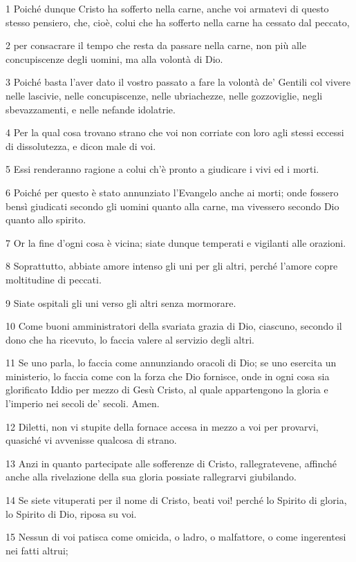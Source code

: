 \par 1 Poiché dunque Cristo ha sofferto nella carne, anche voi armatevi di questo stesso pensiero, che, cioè, colui che ha sofferto nella carne ha cessato dal peccato,
\par 2 per consacrare il tempo che resta da passare nella carne, non più alle concupiscenze degli uomini, ma alla volontà di Dio.
\par 3 Poiché basta l'aver dato il vostro passato a fare la volontà de' Gentili col vivere nelle lascivie, nelle concupiscenze, nelle ubriachezze, nelle gozzoviglie, negli sbevazzamenti, e nelle nefande idolatrie.
\par 4 Per la qual cosa trovano strano che voi non corriate con loro agli stessi eccessi di dissolutezza, e dicon male di voi.
\par 5 Essi renderanno ragione a colui ch'è pronto a giudicare i vivi ed i morti.
\par 6 Poiché per questo è stato annunziato l'Evangelo anche ai morti; onde fossero bensì giudicati secondo gli uomini quanto alla carne, ma vivessero secondo Dio quanto allo spirito.
\par 7 Or la fine d'ogni cosa è vicina; siate dunque temperati e vigilanti alle orazioni.
\par 8 Soprattutto, abbiate amore intenso gli uni per gli altri, perché l'amore copre moltitudine di peccati.
\par 9 Siate ospitali gli uni verso gli altri senza mormorare.
\par 10 Come buoni amministratori della svariata grazia di Dio, ciascuno, secondo il dono che ha ricevuto, lo faccia valere al servizio degli altri.
\par 11 Se uno parla, lo faccia come annunziando oracoli di Dio; se uno esercita un ministerio, lo faccia come con la forza che Dio fornisce, onde in ogni cosa sia glorificato Iddio per mezzo di Gesù Cristo, al quale appartengono la gloria e l'imperio nei secoli de' secoli. Amen.
\par 12 Diletti, non vi stupite della fornace accesa in mezzo a voi per provarvi, quasiché vi avvenisse qualcosa di strano.
\par 13 Anzi in quanto partecipate alle sofferenze di Cristo, rallegratevene, affinché anche alla rivelazione della sua gloria possiate rallegrarvi giubilando.
\par 14 Se siete vituperati per il nome di Cristo, beati voi! perché lo Spirito di gloria, lo Spirito di Dio, riposa su voi.
\par 15 Nessun di voi patisca come omicida, o ladro, o malfattore, o come ingerentesi nei fatti altrui;
